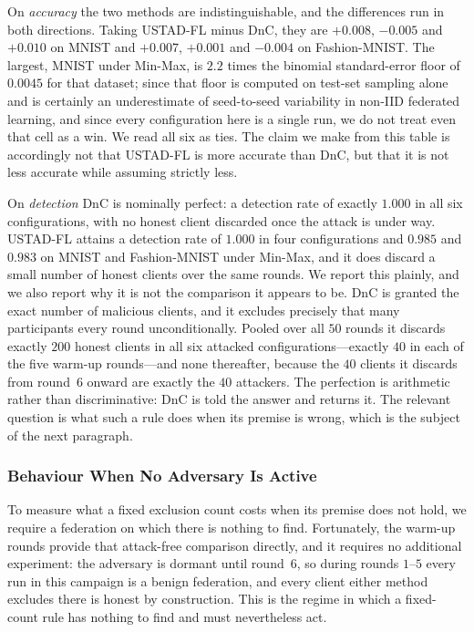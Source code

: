 \documentclass[journal]{IEEEtran}
\begin{document}
On \emph{accuracy} the two methods are indistinguishable, and the differences run in both directions. Taking USTAD-FL minus DnC, they are $+0.008$, $-0.005$ and $+0.010$ on MNIST and $+0.007$, $+0.001$ and $-0.004$ on Fashion-MNIST. The largest, MNIST under Min-Max, is $2.2$ times the binomial standard-error floor of $0.0045$ for that dataset; since that floor is computed on test-set sampling alone and is certainly an underestimate of seed-to-seed variability in non-IID federated learning, and since every configuration here is a single run, we do not treat even that cell as a win. We read all six as ties. The claim we make from this table is accordingly not that USTAD-FL is more accurate than DnC, but that it is not less accurate while assuming strictly less.

On \emph{detection} DnC is nominally perfect: a detection rate of exactly $1.000$ in all six configurations, with no honest client discarded once the attack is under way. USTAD-FL attains a detection rate of $1.000$ in four configurations and $0.985$ and $0.983$ on MNIST and Fashion-MNIST under Min-Max, and it does discard a small number of honest clients over the same rounds. We report this plainly, and we also report why it is not the comparison it appears to be. DnC is granted the exact number of malicious clients, and it excludes precisely that many participants every round unconditionally. Pooled over all $50$ rounds it discards exactly $200$ honest clients in all six attacked configurations---exactly $40$ in each of the five warm-up rounds---and none thereafter, because the $40$ clients it discards from round~$6$ onward are exactly the $40$ attackers. The perfection is arithmetic rather than discriminative: DnC is told the answer and returns it. The relevant question is what such a rule does when its premise is wrong, which is the subject of the next paragraph.

\subsubsection{Behaviour When No Adversary Is Active}
To measure what a fixed exclusion count costs when its premise does not hold, we require a
federation on which there is nothing to find. Fortunately, the warm-up rounds provide that
attack-free comparison directly, and it requires no additional experiment: the adversary is dormant until round~$6$, so during rounds $1$--$5$ every run in this campaign is a benign federation, and every client either method excludes there is honest by construction. This is the regime in which a fixed-count rule has nothing to find and must nevertheless act.
\end{document}

